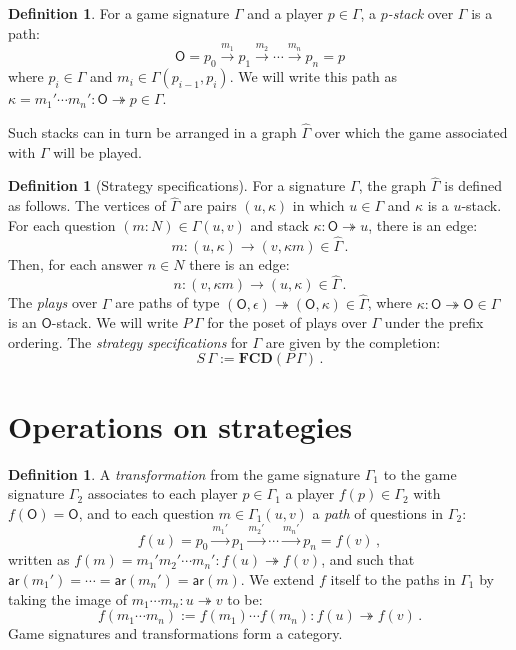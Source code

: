 \documentclass[11pt,oneside,draft]{book}
\theoremstyle{definition}
\newtheorem{definition}[theorem]{Definition}
\newcommand{\kw}[1]{\ensuremath{ \mathsf{#1} }}
\begin{document}
\begin{definition}
For a game signature $\Gamma$ and a player $p \in \Gamma$,
a \emph{$p$-stack} over $\Gamma$ is a path:
\[
  \kw{O} = p_0 \xrightarrow{m_1} p_1 \xrightarrow{m_2} \cdots
             \xrightarrow{m_n} p_n = p
\]
where $p_i \in \Gamma$ and $m_i \in \Gamma(p_{i-1}, p_i)$.
We will write this path as
$\kappa = m_1' \cdots m_n' : \kw{O} \twoheadrightarrow p
 \in \Gamma$.
\end{definition}

Such stacks can in turn be arranged in a graph $\hat{\Gamma}$
over which the game associated with $\Gamma$ will be played.

\begin{definition}[Strategy specifications] %
For a signature $\Gamma$,
the graph $\hat{\Gamma}$ is defined as follows.
The vertices of $\hat{\Gamma}$ are pairs $(u, \kappa)$
in which $u \in \Gamma$ and $\kappa$ is a $u$-stack.
For each question $(m \mathbin: N) \in \Gamma(u,v)$
and stack $\kappa : \kw{O} \twoheadrightarrow u$,
there is an edge:
\[
    m : (u, \kappa) \rightarrow (v, \kappa m) \in \hat{\Gamma} \,.
\]
Then, for each answer $n \in N$
there is an edge:
\[
    n : (v, \kappa m) \rightarrow (u, \kappa) \in \hat{\Gamma} \,.
\]
The \emph{plays} over $\Gamma$
are paths of type
$(\kw{O}, \epsilon) \twoheadrightarrow (\kw{O}, \kappa)
 \in \hat{\Gamma}$,
where $\kappa : \kw{O} \twoheadrightarrow \kw{O} \in \Gamma$
is an $\kw{O}$-stack.
We will write
$P \, \Gamma$
for the poset of plays over $\Gamma$
under the prefix ordering.
The \emph{strategy specifications} for $\Gamma$
are given by the completion:
\[
    S \, \Gamma := \mathbf{FCD}(P \, \Gamma) \,.
\]
\end{definition}


\section{Operations on strategies} %

\begin{definition}
A \emph{transformation}
from the game signature $\Gamma_1$
to the game signature $\Gamma_2$
associates to each player $p \in \Gamma_1$ a player $f(p) \in \Gamma_2$
with $f(\kw{O}) = \kw{O}$,
and to each question $m \in \Gamma_1(u,v)$
a \emph{path} of questions in $\Gamma_2$:
\[
  f(u) = p_0 \xrightarrow{m_1'} p_1 \xrightarrow{m_2'} \cdots
             \xrightarrow{m_n'} p_n = f(v) \,,
\]
written as
$f(m) = m_1' m_2' \cdots m_n' : f(u) \twoheadrightarrow f(v)$, and
such that
$\kw{ar}(m_1') = \cdots = \kw{ar}(m_n') = \kw{ar}(m)$.
We extend $f$ itself to the paths in $\Gamma_1$
by taking the image of $m_1 \cdots m_n : u \twoheadrightarrow v$
to be:
\[
  f(m_1 \cdots m_n) := f(m_1) \cdots f(m_n) :
    f(u) \twoheadrightarrow f(v) \,.
\]
Game signatures and transformations form a category.
\end{definition}
\end{document}
